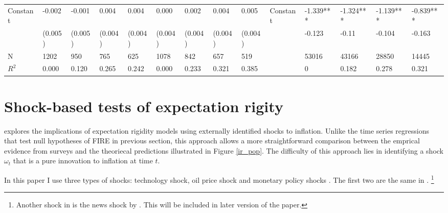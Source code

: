 \documentclass[]{article}
\begin{document}
\begin{table}
\begin{adjustbox}{width={24cm},totalheight={14cm},angle=90}
\begin{tabular}{llllllllllllll}
		Constant               & -0.002      & -0.001    & 0.004     & 0.004     & 0.000         & 0.002     & 0.004     & 0.005     &   Constant                   & -1.339***     & -1.324*** & -1.139*** & -0.839*** \\
		& (0.005)     & (0.005)   & (0.004)   & (0.004)   & (0.004)       & (0.004)   & (0.004)   & (0.004)   &                      & -0.123        & -0.11     & -0.104    & -0.163    \\
		\hline 
		N                    & 1202        & 950       & 765       & 625       & 1078          & 842       & 657       & 519       &                      & 53016         & 43166     & 28850     & 14445     \\
		$R^2$ & 0.000       & 0.120     & 0.265     & 0.242     & 0.000         & 0.233     & 0.321     & 0.385     &                      & 0             & 0.182     & 0.278     & 0.321  \\
		\hline    
	\end{tabular}
\end{adjustbox}
\end{table}
	
\section{Shock-based tests of expectation rigity }\label{IRShocks}

 \citet{coibion2012can} explores the implications of expectation rigidity models using externally identified shocks to inflation.  Unlike the time series regressions that test null hypotheses of FIRE in previous section, this approach allows a more straightforward comparison between the emprical evidence from surveys and the theoriecal predictions illustrated in Figure \ref{ir_pop}. The difficulty of this approach lies in identifying a shock $\omega_t$ that is a pure innovation to inflation at time $t$. 
 
In this paper I use three types of shocks: technology shock\citet{gali1999technology}, oil price shock\citet{hamilton1996happened} and monetary policy shocks \citet{laseen2011anticipated}. The first two are the same in \citet{coibion2012can}. \footnote{ Another shock in \citet{coibon2012can} is the news shock by \citet{barsky2011news}. This will be included in later version of the paper.} 
\end{document}
